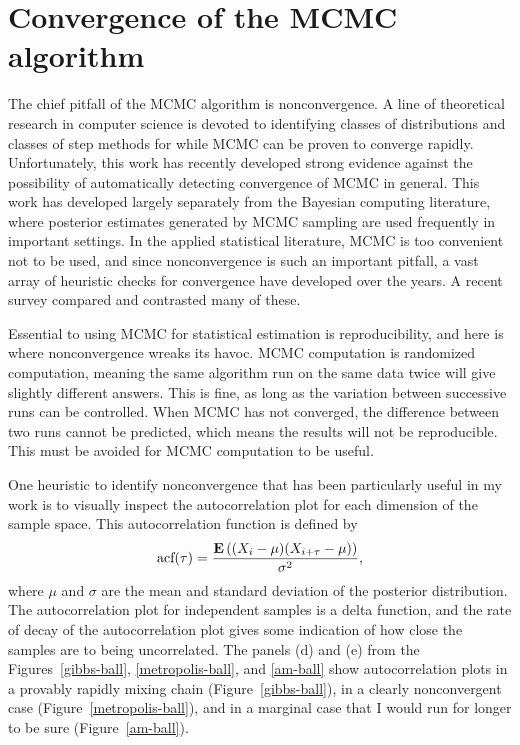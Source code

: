 \section{Convergence of the MCMC algorithm}

The chief pitfall of the MCMC algorithm is nonconvergence.  A line of
theoretical research in computer science is devoted to identifying
classes of distributions and classes of step methods for while MCMC
can be proven to converge rapidly.\cite{TCS_refs_on_convergence}
Unfortunately, this work has recently developed strong evidence
against the possibility of automatically detecting convergence of MCMC
in general.\cite{Trevisan_et_al_MCMC_convergence} This work has
developed largely separately from the Bayesian computing literature,
where posterior estimates generated by MCMC sampling are used
frequently in important settings.\cite{PK,Eco,Stats,Astro_examples} In
the applied statistical literature, MCMC is too convenient not to be
used, and since nonconvergence is such an important pitfall, a vast
array of heuristic checks for convergence have developed over the
years.\cite{key_examples_of_convergence_heuristics} A recent survey
compared and contrasted many of
these.\cite{survey_of_convergence_techniques}

Essential to using MCMC for statistical estimation is reproducibility,
and here is where nonconvergence wreaks its havoc.  MCMC computation
is randomized computation, meaning the same algorithm run on the same
data twice will give slightly different answers.  This is fine, as
long as the variation between successive runs can be controlled.  When
MCMC has not converged, the difference between two runs cannot be
predicted, which means the results will not be reproducible.  This
must be avoided for MCMC computation to be useful.

One heuristic to identify nonconvergence that has been particularly
useful in my work is to visually inspect the autocorrelation plot for
each dimension of the sample space.  This autocorrelation function is defined by
\[
\text{acf}(\tau) = \frac{\mathbf{E}\left((X_i - \mu)(X_{i+\tau} - \mu)\right)}{\sigma^2},
\]
where $\mu$ and $\sigma$ are the mean and standard deviation of the
posterior distribution.  The autocorrelation plot for independent
samples is a delta function, and the rate of decay of the
autocorrelation plot gives some indication of how close the samples
are to being uncorrelated.  The panels (d) and (e) from the
Figures~\ref{gibbs-ball}, \ref{metropolis-ball}, and \ref{am-ball}
show autocorrelation plots in a provably rapidly mixing chain
(Figure~\ref{gibbs-ball}), in a clearly nonconvergent case
(Figure~\ref{metropolis-ball}), and in a marginal case that I would
run for longer to be sure (Figure~\ref{am-ball}).

